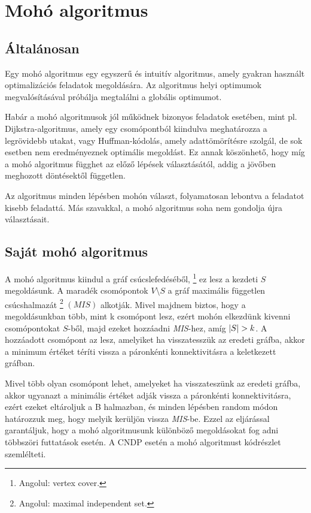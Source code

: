 \section{Mohó algoritmus}\label{sec:MOHO_ALGORITMUS}

\subsection{Általánosan}
Egy mohó algoritmus egy egyszerű és intuitív algoritmus, amely gyakran használt
optimalizációs feladatok megoldására. Az algoritmus helyi optimumok megvalósításával próbálja
megtalálni a globális optimumot.

Habár a mohó algoritmusok jól működnek bizonyos feladatok esetében,
mint pl. Dijkstra-algoritmus, amely egy csomópontból kiindulva meghatározza a legrövidebb utakat,
vagy Huffman-kódolás, amely adattömörítésre szolgál, de sok esetben nem eredményeznek optimális megoldást.
Ez annak köszönhető, hogy míg a mohó algoritmus függhet az előző lépések választásától,
addig a jövőben meghozott döntésektől független.

Az algoritmus minden lépésben mohón választ, folyamatosan lebontva a feladatot kisebb feladattá.
Más szavakkal, a mohó algoritmus soha nem gondolja újra választásait.

\subsection{Saját mohó algoritmus}
A mohó algoritmus kiindul a gráf csúcslefedéséből,
\footnote{
  Angolul: vertex cover.
}
ez lesz a kezdeti $S$ megoldásunk.
A maradék csomópontok $V \setminus S$  a gráf maximális független csúcshalmazát
\footnote{
  Angolul: maximal independent set.
}
$\left( \textit{MIS} \right)$ alkotják.
Mivel majdnem biztos, hogy a megoldásunkban több, mint k csomópont lesz, ezért mohón elkezdünk kivenni csomópontokat $S$-ből,
majd ezeket hozzáadni \emph{MIS}-hez, amíg $\lvert S\rvert > k$.
A hozzáadott csomópont az lesz, amelyiket ha visszatesszük az eredeti gráfba,
akkor a minimum értéket téríti vissza a páronkénti konnektivitásra a keletkezett gráfban.

Mivel több olyan csomópont lehet, amelyeket ha visszateszünk az eredeti gráfba,
akkor ugyanazt a minimális értéket adják vissza a páronkénti konnektivitásra,
ezért ezeket eltároljuk a B halmazban, és minden lépésben random módon határozzuk meg,
hogy melyik kerüljön vissza \emph{MIS}-be. Ezzel az eljárással garantáljuk,
hogy a mohó algoritmusunk különböző megoldásokat fog adni többszöri futtatások esetén.
A CNDP esetén a mohó algoritmust  kódrészlet szemlélteti.

